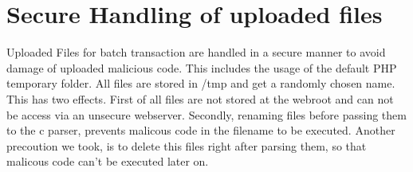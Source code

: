 \section{Secure Handling of uploaded files}
Uploaded Files for batch transaction are handled in a secure manner to avoid damage of uploaded malicious code. This includes the usage of the default PHP temporary folder. All files are stored in /tmp and get a randomly chosen name. This has two effects. First of all files are not stored at the webroot and can not be access via an unsecure webserver. Secondly, renaming files before passing them to the c parser, prevents malicous code in the filename to be executed.
\newline
Another precoution we took, is to delete this files right after parsing them, so that malicous code can't be executed later on. 


